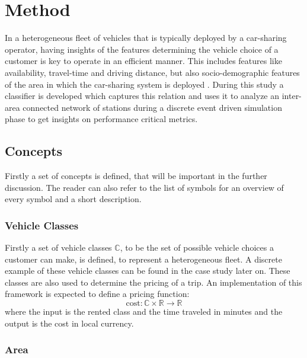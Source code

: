 \clearpage
\section{Method}
\label{sec:Method}

In a heterogeneous fleet of vehicles that is typically deployed by a car-sharing operator,
having insights of the features determining the vehicle choice of a customer is key
to operate in an efficient manner. This includes features like availability, travel-time
and driving distance, but also socio-demographic features of the area in which the
car-sharing system is deployed .  During this study a classifier is developed which 
captures this relation and uses it to analyze an inter-area connected network of stations
during a discrete event driven simulation phase to get insights on performance critical
metrics.

\subsection{Concepts}
\label{sub_sec:Method/Concepts}

Firstly a set of concepts is defined, that will be important in the further discussion. The reader can also
refer to the list of symbols for an overview of every symbol and a short description.

\subsubsection{Vehicle Classes}
\label{sub_sec:Method/Concepts/Classes}

Firstly a set of vehicle classes $\mathbb{C}$, to be the set of possible vehicle choices a customer can make,
is defined, to represent a heterogeneous fleet. A
discrete example of these vehicle classes can be found in the case study later on. These
classes are also used to determine the pricing of a trip. An implementation of this
framework is expected to define a pricing function:
$$
\text{cost}: \mathbb{C} \times  \mathbb{R} \to \mathbb{R}
$$
where the input is the rented class and the time traveled in minutes and the output is the
cost in local currency.

\subsubsection{Area}
\label{sub_sec:Method/Concepts/Area}

